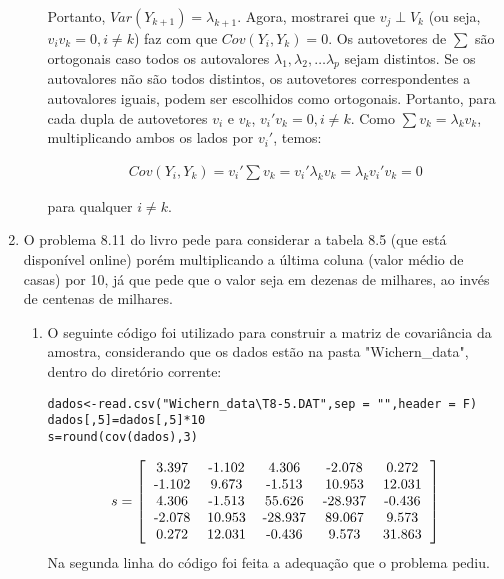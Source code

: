 \documentclass[11pt,a4paper]{book}
\begin{document}
\begin{enumerate}
\begin{enumerate}[label=\alph*)]
			Portanto, $Var(Y_{k+1})=\lambda_{k+1}$.
			Agora, mostrarei que $v_j \perp V_k$ (ou seja, $v_iv_k=0, i\neq k$) faz com que $Cov(Y_i,Y_k)=0$.
			Os autovetores de $\sum$ são ortogonais caso todos os autovalores $\lambda_1, \lambda_2, \ldots \lambda_p$ sejam distintos.
			Se os autovalores não são todos distintos, os autovetores correspondentes a autovalores iguais, podem ser escolhidos como ortogonais.
			Portanto, para cada dupla de autovetores $v_i$ e $v_k$, $v_i'v_k=0, i\neq k$.
			Como $\sum v_k=\lambda_k v_k$, multiplicando ambos os lados por $v_i'$, temos:
			
			\begin{eqnarray*}
				Cov(Y_i,Y_k)=v_i'\sum v_k=v_i'\lambda_k v_k=\lambda_k v_i'v_k=0
			\end{eqnarray*}
			
			para qualquer $i\neq k$.
		\end{enumerate}
		
		\item
		
		O problema 8.11 do livro pede para considerar a tabela 8.5 (que está disponível online) porém multiplicando a última coluna (valor médio de casas) por 10, já que pede que o valor seja em dezenas de milhares, ao invés de centenas de milhares.
			\begin{enumerate}[label=\alph*)]
				\item O seguinte código foi utilizado para construir a matriz de covariância da amostra, considerando que os dados estão na pasta "Wichern\_data", dentro do diretório corrente:
				\begin{lstlisting}
dados<-read.csv("Wichern_data\T8-5.DAT",sep = "",header = F)
dados[,5]=dados[,5]*10
s=round(cov(dados),3)
				\end{lstlisting}
				\begin{eqnarray*}
					s=\left[
					\begin{tabular}{c c c c c}
					3.397 & -1.102 & 4.306 & -2.078 & 0.272\\
					-1.102 & 9.673 & -1.513 & 10.953 & 12.031\\
					4.306 & -1.513 & 55.626 & -28.937 & -0.436\\
					-2.078 & 10.953 & -28.937 & 89.067 & 9.573\\
					0.272 & 12.031 & -0.436 & 9.573 & 31.863
					\end{tabular}
					\right]
				\end{eqnarray*}
				Na segunda linha do código foi feita a adequação que o problema pediu.
				

\end{enumerate}
\end{enumerate}
\end{document}
